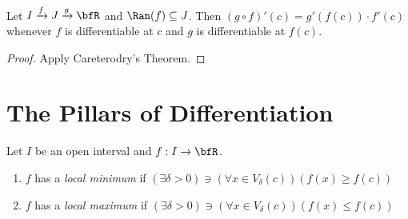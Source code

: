     \begin{proposition}
        Let $I \xrightarrow{f} J \xrightarrow{g} \bfR$ and $\Ran(f) \subseteq J$. Then $(g \circ f)'(c) = g'(f(c)) \cdot f'(c)$ whenever $f$ is differentiable at $c$ and $g$ is differentiable at $f(c)$.
    \end{proposition}
        \begin{proof}
            Apply Careterodry's Theorem.
        \end{proof}

\section{The Pillars of Differentiation}
    \begin{definition}
        Let $I$ be an open interval and $f:I \rightarrow \bfR$.
        \begin{enumerate}[label = (\arabic*)]
            \item $f$ has a \textit{local minimum} if $(\exists \delta > 0)\ni (\forall x\in V_\delta(c))(f(x) \geq f(c))$
            \item $f$ has a \textit{local maximum} if $(\exists \delta > 0)\ni (\forall x\in V_\delta(c))(f(x) \leq f(c))$
        \end{enumerate}
    \end{definition}

